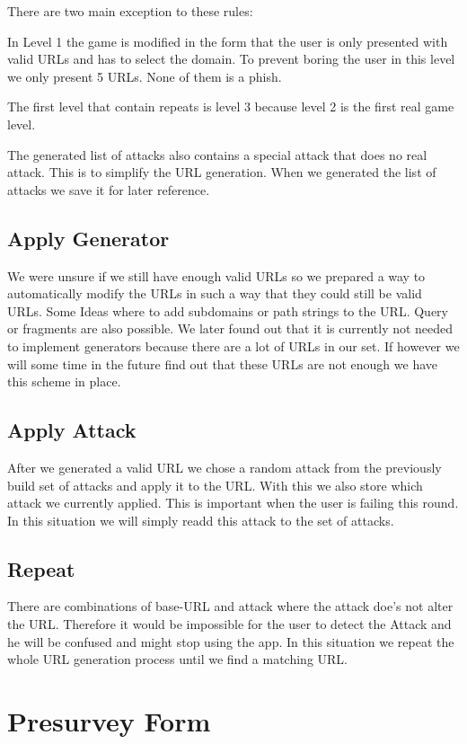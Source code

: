 There are two main exception to these rules:
\begin{description}[leftmargin=0cm]
\item[Level 1] In Level 1 the game is modified in the form that the user is only presented with valid URLs and has to select the domain.
To prevent boring the user in this level we only present 5 URLs.
None of them is a phish.
\item[Level 1+2] The first level that contain repeats is level 3 because level 2 is the first real game level.
\end{description}

The generated list of attacks also contains a special attack that does no real attack. This is to simplify the URL generation. When we generated the list of attacks we save it for later reference.
\subsection{Apply Generator}
We were unsure if we still have enough valid URLs so we prepared a way to automatically modify the URLs in such a way that they could still be valid URLs. Some Ideas where to add subdomains or path strings to the URL. Query or fragments are also possible. We later found out that it is currently not needed to implement generators because there are a lot of URLs in our set. If however we will some time in the future find out that these URLs are not enough we have this scheme in place.
\subsection{Apply Attack}
After we generated a valid URL we chose a random attack from the previously build set of attacks and apply it to the URL. With this we also store which attack we currently applied. This is important when the user is failing this round. In this situation we will simply readd this attack to the set of attacks.
\subsection{Repeat}
There are combinations of base-URL and attack where the attack doe's not alter the URL.
Therefore it would be impossible for the user to detect the Attack and he will be confused and might stop using the app.
In this situation we repeat the whole URL generation process until we find a matching URL.

\section{Presurvey Form}
\label{s:presurvey_form}


